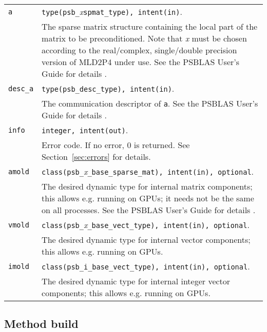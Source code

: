 \begin{tabular}{p{1.2cm}p{12cm}}
\verb|a|      & \verb|type(psb_|\emph{x}\verb|spmat_type), intent(in)|. \\
              & The sparse matrix structure containing the local part of the
                matrix to be preconditioned. Note that \emph{x} must be chosen according
                to the real/complex, single/double precision version of MLD2P4 under use.
                See the PSBLAS User's Guide for details \cite{PSBLASGUIDE}.\\
\verb|desc_a| & \verb|type(psb_desc_type), intent(in)|. \\
              & The communication descriptor of \verb|a|. See the PSBLAS User's Guide for
                details \cite{PSBLASGUIDE}.\\
\verb|info|   & \verb|integer, intent(out)|.\\
              & Error code. If no error, 0 is returned. See Section~\ref{sec:errors} for details.\\
\verb|amold| & \verb|class(psb_|\emph{x}\verb|_base_sparse_mat), intent(in), optional|. \\
 & The desired dynamic type for internal matrix
  components; this allows e.g. running on GPUs; it needs not be the
  same on all processes. See the PSBLAS User's Guide for
  details \cite{PSBLASGUIDE}. \\
  \verb|vmold| & \verb|class(psb_|\emph{x}\verb|_base_vect_type), intent(in), optional|. \\
  & The desired dynamic type for internal vector
  components; this allows e.g. running on GPUs. \\
  \verb|imold| & \verb|class(psb_i_base_vect_type), intent(in), optional|. \\
  & The desired dynamic type for internal integer vector
  components; this allows e.g. running on GPUs. \\
\end{tabular}

\clearpage

\subsection{Method build\label{sec:precbld}}
  
